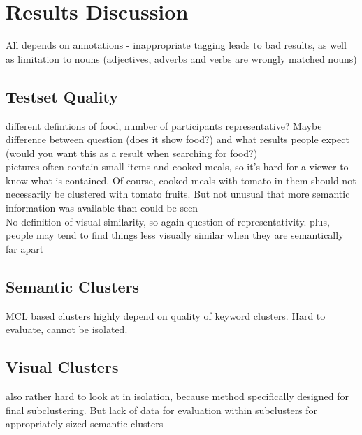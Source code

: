 %
\section{Results Discussion}
\label{sec_discussion}


All depends on annotations - inappropriate tagging leads to bad results, as well as limitation to nouns (adjectives, adverbs and verbs are wrongly matched nouns) \\

\subsection{Testset Quality}
different defintions of food, number of participants representative? Maybe difference between question (does it show food?) and what results people expect (would you want this as a result when searching for food?) \\
pictures often contain small items and cooked meals, so it's hard for a viewer to know what is contained. Of course, cooked meals with tomato in them should not necessarily be clustered with tomato fruits. But not unusual that more semantic information was available than could be seen\\
No definition of visual similarity, so again question of representativity. plus, people may tend to find things less visually similar when they are semantically far apart

\subsection{Semantic Clusters}
MCL based clusters highly depend on quality of keyword clusters. Hard to evaluate, cannot be isolated.\\


\subsection{Visual Clusters}
also rather hard to look at in isolation, because method specifically designed for final subclustering. But lack of data for evaluation within subclusters for appropriately sized semantic clusters